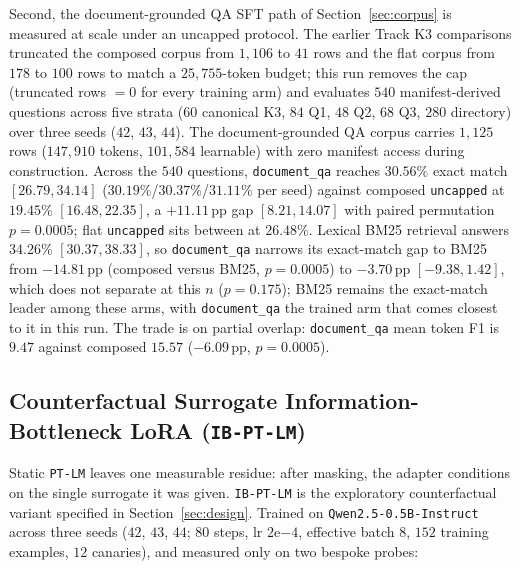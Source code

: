 \documentclass{article}
\begin{document}
Second, the document-grounded QA SFT path of Section~\ref{sec:corpus} is measured at scale under an uncapped protocol. The earlier Track K3 comparisons truncated the composed corpus from $1{,}106$ to $41$ rows and the flat corpus from $178$ to $100$ rows to match a $25{,}755$-token budget; this run removes the cap (truncated rows $= 0$ for every training arm) and evaluates $540$ manifest-derived questions across five strata ($60$ canonical K3, $84$ Q1, $48$ Q2, $68$ Q3, $280$ directory) over three seeds ($42$, $43$, $44$). The document-grounded QA corpus carries $1{,}125$ rows ($147{,}910$ tokens, $101{,}584$ learnable) with zero manifest access during construction. Across the $540$ questions, \texttt{document\_qa} reaches $\mathbf{30.56\%}$ exact match $[26.79, 34.14]$ ($30.19\%$/$30.37\%$/$31.11\%$ per seed) against composed \texttt{uncapped} at $19.45\%$ $[16.48, 22.35]$, a $+11.11$\,pp gap $[8.21, 14.07]$ with paired permutation $p{=}0.0005$; flat \texttt{uncapped} sits between at $26.48\%$. Lexical BM25 retrieval answers $34.26\%$ $[30.37, 38.33]$, so \texttt{document\_qa} narrows its exact-match gap to BM25 from $-14.81$\,pp (composed versus BM25, $p{=}0.0005$) to $-3.70$\,pp $[-9.38, 1.42]$, which does not separate at this $n$ ($p{=}0.175$); BM25 remains the exact-match leader among these arms, with \texttt{document\_qa} the trained arm that comes closest to it in this run. The trade is on partial overlap: \texttt{document\_qa} mean token F1 is $9.47$ against composed $15.57$ ($-6.09$\,pp, $p{=}0.0005$).

\subsection{Counterfactual Surrogate Information-Bottleneck LoRA (\texttt{IB-PT-LM})}
\label{sec:ib-ptlm}

Static \texttt{PT-LM} leaves one measurable residue: after masking, the adapter conditions on the single surrogate it was given. \texttt{IB-PT-LM} is the exploratory counterfactual variant specified in Section~\ref{sec:design}. Trained on \texttt{Qwen2.5-0.5B-Instruct} across three seeds ($42$, $43$, $44$; $80$ steps, lr $2\mathrm{e}{-4}$, effective batch $8$, $152$ training examples, $12$ canaries), and measured only on two bespoke probes:
\end{document}
